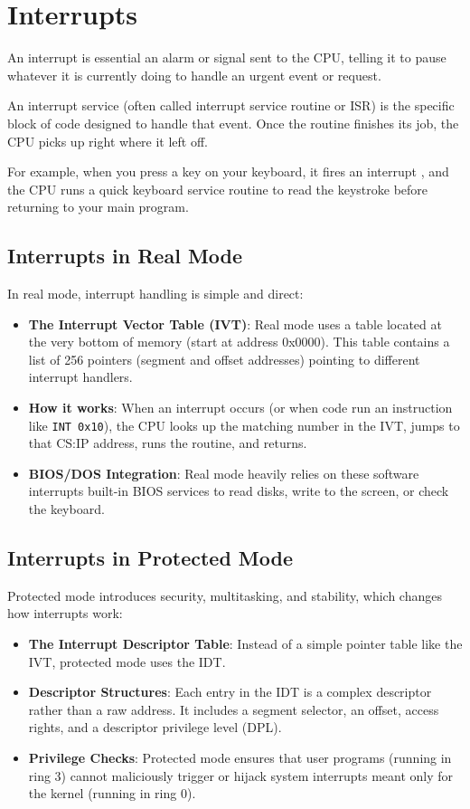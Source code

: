 \section{Interrupts}

An interrupt is essential an alarm or signal sent to the CPU, telling it to
pause whatever it is currently doing to handle an urgent event or request.

An interrupt service (often called interrupt service routine or ISR) is the
specific block of code designed to handle that event. Once the routine
finishes its job, the CPU picks up right where it left off.

For example, when you press a key on your keyboard, it fires an interrupt
, and the CPU runs a quick keyboard service routine to read the keystroke
before returning to your main program.

\subsection{Interrupts in Real Mode}

In real mode, interrupt handling is simple and direct:

\begin{itemize}
\item
  \textbf{The Interrupt Vector Table (IVT)}: Real mode uses a table located at the very
  bottom of memory (start at address 0x0000). This table contains a list of 256
  pointers (segment and offset addresses) pointing to different interrupt handlers.
\item
  \textbf{How it works}: When an interrupt occurs (or when code run an instruction like
  \texttt{INT\ 0x10}), the CPU looks up the matching number in the IVT, jumps to that
  CS:IP address, runs the routine, and returns.
\item
  \textbf{BIOS/DOS Integration}: Real mode heavily relies on these software interrupts
  built-in BIOS services to read disks, write to the screen, or check the
  keyboard.
\end{itemize}

\subsection{Interrupts in Protected Mode}

Protected mode introduces security, multitasking, and stability, which changes
how interrupts work:

\begin{itemize}
\item
  \textbf{The Interrupt Descriptor Table}: Instead of a simple pointer table like the
  IVT, protected mode uses the IDT.
\item
  \textbf{Descriptor Structures}: Each entry in the IDT is a complex descriptor rather
  than a raw address. It includes a segment selector,
  an offset, access rights, and a descriptor privilege
  level (DPL).
\item
  \textbf{Privilege Checks}: Protected mode ensures that user programs (running in ring
  3) cannot maliciously trigger or hijack system interrupts
  meant only for the kernel (running in ring 0).
\end{itemize}

